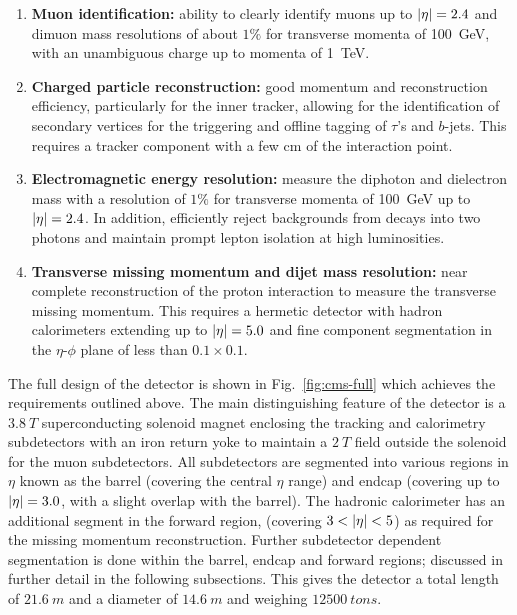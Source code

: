 \begin{enumerate}
    \item \textbf{Muon identification:} ability to clearly identify muons up to
    $|\eta|=2.4$ and dimuon mass resolutions of about $1\%$ for transverse
    momenta of \SI{100}{GeV}, with an unambiguous charge up to momenta of
    \SI{1}{TeV}.
    \item \textbf{Charged particle reconstruction:} good momentum and
    reconstruction efficiency, particularly for the inner tracker, allowing
    for the identification of secondary vertices for the triggering and
    offline tagging of $\tau$'s and $b$-jets. This requires a tracker component
    with a few cm of the interaction point.
    \item \textbf{Electromagnetic energy resolution:} measure the diphoton and
    dielectron mass with a resolution of $1\%$ for transverse momenta of
    \SI{100}{GeV} up to $|\eta|=2.4$. In addition, efficiently reject backgrounds
    from \Ppizero decays into two photons and maintain prompt lepton isolation
    at high luminosities.
    \item \textbf{Transverse missing momentum and dijet mass resolution:} near
    complete reconstruction of the proton interaction to measure the
    transverse missing momentum. This requires a hermetic detector with hadron
    calorimeters extending up to $|\eta|=5.0$ and fine component segmentation
    in the $\eta$-$\phi$ plane of less than $0.1\times 0.1$.
\end{enumerate}

The full design of the \CMS detector is shown in Fig.~\ref{fig:cms-full} which
achieves the requirements outlined above. The main distinguishing feature of
the \CMS detector is a ${\SI{3.8}{T}}$ superconducting solenoid magnet
enclosing the tracking and calorimetry subdetectors with an iron return yoke
to maintain a ${\SI{2}{T}}$ field outside the solenoid for the muon
subdetectors. All subdetectors are segmented into various regions in $\eta$
known as the barrel (covering the central $\eta$ range) and endcap (covering
up to $|\eta|=3.0$, with a slight overlap with the barrel). The hadronic
calorimeter has an additional segment in the forward region, (covering
$3<\aeta<5$) as required for the missing momentum reconstruction. Further
subdetector dependent segmentation is done within the barrel, endcap and
forward regions; discussed in further detail in the following subsections.
This gives the \CMS detector a total length of ${\SI{21.6}{m}}$ and a diameter
of ${\SI{14.6}{m}}$ and weighing ${\SI{12500}{tons}}$.

